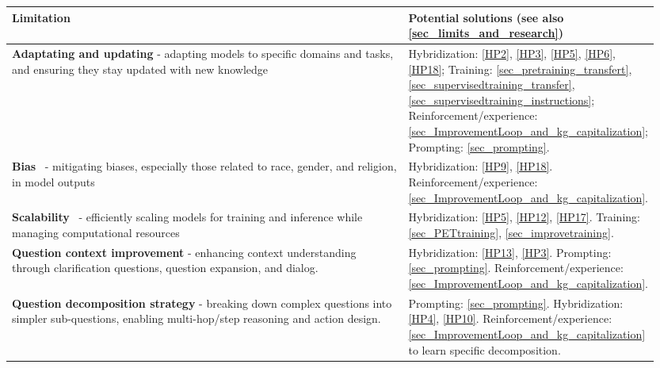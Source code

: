 \documentclass[acmsmall]{acmart}
\begin{document}
\vspace{-4mm} %
{
\begin{longtable}{p{0.7\linewidth} >{\tiny}p{0.25\linewidth}}
\label{Table2LLMArchPatterns}\\

Limitation & Potential solutions (see also \autoref{sec_limits_and_research}) \\\midrule

\textbf{Adaptating and updating} - adapting models to specific domains and tasks, and ensuring they stay updated with new knowledge
&
    Hybridization: \ref{HP2}, \ref{HP3}, \ref{HP5}, \ref{HP6}, \ref{HP18}; Training: \ref{sec_pretraining_transfert}, \ref{sec_supervisedtraining_transfer}, \ref{sec_supervisedtraining_instructions}; Reinforcement/experience: \ref{sec_ImprovementLoop_and_kg_capitalization};
    Prompting: \ref{sec_prompting}.
\\

\textbf{Bias}~\citep{liangetal.HolisticEvaluationLanguage2022} - mitigating biases, especially those related to race, gender, and religion, in model outputs
&
    Hybridization: \ref{HP9}, \ref{HP18}.
    Reinforcement/experience: \ref{sec_ImprovementLoop_and_kg_capitalization}.
\\   

\textbf{Scalability}~\citep{liangetal.HolisticEvaluationLanguage2022} - efficiently scaling models for training and inference while managing computational resources
&
    Hybridization: \ref{HP5}, \ref{HP12}, \ref{HP17}.
    Training: \ref{sec_PETtraining}, \ref{sec_improvetraining}.
\\   

\textbf{Question context improvement} - enhancing context understanding through clarification questions, question expansion, and dialog.
&
    Hybridization: \ref{HP13}, \ref{HP3}.
    Prompting: \ref{sec_prompting}.
    Reinforcement/experience: \ref{sec_ImprovementLoop_and_kg_capitalization}.
\\

\textbf{Question decomposition strategy} - breaking down complex questions into simpler sub-questions, enabling multi-hop/step reasoning and action design.
&
    Prompting: \ref{sec_prompting}.
    Hybridization: \ref{HP4}, \ref{HP10}.
    Reinforcement/experience: \ref{sec_ImprovementLoop_and_kg_capitalization} to learn specific decomposition.
\\


\end{longtable}}
\end{document}
